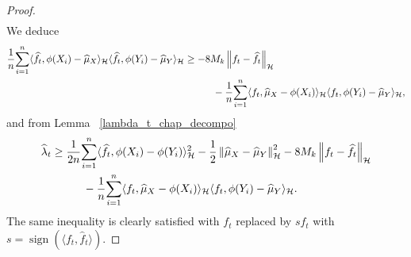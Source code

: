 \documentclass[twoside,11pt]{article}
\newcommand{\Hk}{\mathcal{H}}
\newcommand{\nb}{n}
\DeclareMathOperator{\sign}{sign}
\begin{document}
\begin{proof}
\begin{align*}
\end{align*}
We deduce 
\begin{align*}
    \frac{1}{\nb} \underset{i=1}{\overset{\nb}{\sum}} \langle \widehat{f}_t, \phi(X_i) - \widehat{\mu}_X  \rangle_{\Hk} \langle \widehat{f}_t,\phi(Y_i) - \widehat{\mu}_Y  \rangle_{\Hk} &\geq - 8   M_k \left \|  f_t - \widehat{f}_t \right \|_{\Hk} \\
    & \hspace{1 cm} - \frac{1}{\nb} \underset{i=1}{\overset{\nb}{\sum}} \langle f_t, \widehat{\mu}_X - \phi(X_i) \rangle_{\Hk} \langle f_t,\phi(Y_i) - \widehat{\mu}_Y  \rangle_{\Hk},
\end{align*}
and from Lemma ~\ref{lambda_t_chap_decompo} 
\begin{align*} 
    \widehat{\lambda}_t &\geq \frac{1}{2\nb} \underset{i=1}{\overset{\nb}{\sum}} \langle \widehat{f}_t, \phi(X_i) - \phi(Y_i)\rangle_{\Hk}^2 - \frac{1}{2} \left \|  \widehat{\mu}_X - \widehat{\mu}_Y \right \|_{\Hk}^2 - 8  M_k \left \|  f_t - \widehat{f}_t \right \|_{\Hk} \\
    & \hspace{1 cm} - \frac{1}{\nb} \underset{i=1}{\overset{\nb}{\sum}} \langle f_t, \widehat{\mu}_X - \phi(X_i) \rangle_{\Hk} \langle f_t,\phi(Y_i) - \widehat{\mu}_Y  \rangle_{\Hk}. 
\end{align*}
The same inequality is clearly satisfied with $f_t$ replaced by $s f_t$ with $s = \sign(\langle f_t, \hat f_t \rangle )$. 
\end{proof}
\end{document}
